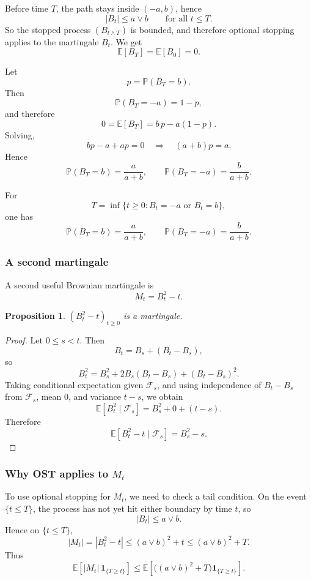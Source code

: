 \documentclass[11pt]{article}
\newtheorem{proposition}[theorem]{Proposition}
\theoremstyle{definition}
\begin{document}
Before time \(T\), the path stays inside \((-a,b)\), hence
\[
|B_t|\le a\vee b
\qquad \text{for all } t\le T.
\]
So the stopped process \((B_{t\wedge T})\) is bounded, and therefore optional stopping applies to the martingale \(B_t\). We get
\[
\mathbb E[B_T]=\mathbb E[B_0]=0.
\]

Let
\[
p=\mathbb P(B_T=b).
\]
Then
\[
\mathbb P(B_T=-a)=1-p,
\]
and therefore
\[
0=\mathbb E[B_T]=b\,p-a(1-p).
\]
Solving,
\[
bp-a+ap=0
\quad\Longrightarrow\quad
(a+b)p=a.
\]
Hence
\[
\mathbb P(B_T=b)=\frac{a}{a+b},
\qquad
\mathbb P(B_T=-a)=\frac{b}{a+b}.
\]

\begin{keyformula}
For
\[
T=\inf\{t\ge 0:B_t=-a\text{ or }B_t=b\},
\]
one has
\[
\mathbb P(B_T=b)=\frac{a}{a+b},
\qquad
\mathbb P(B_T=-a)=\frac{b}{a+b}.
\]
\end{keyformula}

\subsubsection{A second martingale}

A second useful Brownian martingale is
\[
M_t=B_t^2-t.
\]

\begin{proposition}
\((B_t^2-t)_{t\ge 0}\) is a martingale.
\end{proposition}

\begin{proof}
Let \(0\le s<t\). Then
\[
B_t=B_s+(B_t-B_s),
\]
so
\[
B_t^2
=
B_s^2+2B_s(B_t-B_s)+(B_t-B_s)^2.
\]
Taking conditional expectation given \(\mathcal F_s\), and using independence of \(B_t-B_s\) from \(\mathcal F_s\), mean \(0\), and variance \(t-s\), we obtain
\[
\mathbb E[B_t^2\mid \mathcal F_s]
=
B_s^2+0+(t-s).
\]
Therefore
\[
\mathbb E[B_t^2-t\mid \mathcal F_s]
=
B_s^2-s.
\]
\end{proof}

\subsubsection[Why OST applies to Mt]{Why OST applies to \texorpdfstring{$M_t$}{Mt}}

To use optional stopping for \(M_t\), we need to check a tail condition. On the event \(\{t\le T\}\), the process has not yet hit either boundary by time \(t\), so
\[
|B_t|\le a\vee b.
\]
Hence on \(\{t\le T\}\),
\[
|M_t|
=
|B_t^2-t|
\le
(a\vee b)^2+t
\le
(a\vee b)^2+T.
\]
Thus
\[
\mathbb E\!\left[|M_t|\,\mathbf 1_{\{T\ge t\}}\right]
\le
\mathbb E\!\left[\bigl((a\vee b)^2+T\bigr)\mathbf 1_{\{T\ge t\}}\right].
\]
\end{document}
